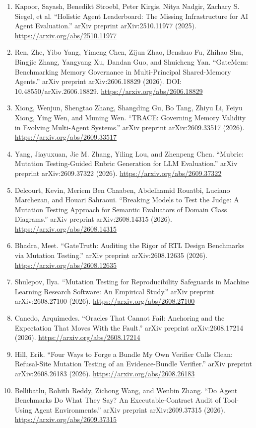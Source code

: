 \documentclass[11pt]{article}
\begin{document}
\begin{enumerate}[leftmargin=*]
\item Kapoor, Sayash, Benedikt Stroebl, Peter Kirgis, Nitya Nadgir, Zachary S. Siegel, et al. ``Holistic Agent Leaderboard: The Missing Infrastructure for AI Agent Evaluation.'' arXiv preprint arXiv:2510.11977 (2025). \url{https://arxiv.org/abs/2510.11977}
\item Ren, Zhe, Yibo Yang, Yimeng Chen, Zijun Zhao, Benshuo Fu, Zhihao Shu, Bingjie Zhang, Yangyang Xu, Dandan Guo, and Shuicheng Yan. ``GateMem: Benchmarking Memory Governance in Multi-Principal Shared-Memory Agents.'' arXiv preprint arXiv:2606.18829 (2026). DOI: 10.48550/arXiv.2606.18829. \url{https://arxiv.org/abs/2606.18829}
\item Xiong, Wenjun, Shengtao Zhang, Shangding Gu, Bo Tang, Zhiyu Li, Feiyu Xiong, Ying Wen, and Muning Wen. ``TRACE: Governing Memory Validity in Evolving Multi-Agent Systems.'' arXiv preprint arXiv:2609.33517 (2026). \url{https://arxiv.org/abs/2609.33517}
\item Yang, Jiayuxuan, Jie M. Zhang, Yiling Lou, and Zhenpeng Chen. ``Mubric: Mutation Testing-Guided Rubric Generation for LLM Evaluation.'' arXiv preprint arXiv:2609.37322 (2026). \url{https://arxiv.org/abs/2609.37322}
\item Delcourt, Kevin, Meriem Ben Chaaben, Abdelhamid Rouatbi, Luciano Marchezan, and Houari Sahraoui. ``Breaking Models to Test the Judge: A Mutation Testing Approach for Semantic Evaluators of Domain Class Diagrams.'' arXiv preprint arXiv:2608.14315 (2026). \url{https://arxiv.org/abs/2608.14315}
\item Bhadra, Meet. ``GateTruth: Auditing the Rigor of RTL Design Benchmarks via Mutation Testing.'' arXiv preprint arXiv:2608.12635 (2026). \url{https://arxiv.org/abs/2608.12635}
\item Shulepov, Ilya. ``Mutation Testing for Reproducibility Safeguards in Machine Learning Research Software: An Empirical Study.'' arXiv preprint arXiv:2608.27100 (2026). \url{https://arxiv.org/abs/2608.27100}
\item Canedo, Arquimedes. ``Oracles That Cannot Fail: Anchoring and the Expectation That Moves With the Fault.'' arXiv preprint arXiv:2608.17214 (2026). \url{https://arxiv.org/abs/2608.17214}
\item Hill, Erik. ``Four Ways to Forge a Bundle My Own Verifier Calls Clean: Refusal-Site Mutation Testing of an Evidence-Bundle Verifier.'' arXiv preprint arXiv:2608.26183 (2026). \url{https://arxiv.org/abs/2608.26183}
\item Bellibatlu, Rohith Reddy, Zichong Wang, and Wenbin Zhang. ``Do Agent Benchmarks Do What They Say? An Executable-Contract Audit of Tool-Using Agent Environments.'' arXiv preprint arXiv:2609.37315 (2026). \url{https://arxiv.org/abs/2609.37315}

\end{enumerate}
\end{document}
